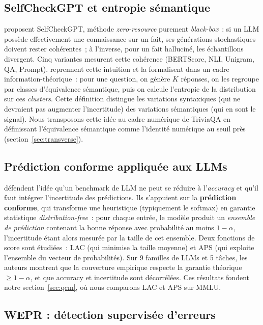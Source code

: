 \documentclass[12pt,a4paper]{article}
\begin{document}
\subsection{SelfCheckGPT et entropie sémantique}

\citet{manakul2023selfcheckgpt} proposent SelfCheckGPT, méthode \textit{zero-resource} purement \textit{black-box}~: si un LLM possède effectivement une connaissance sur un fait, ses générations stochastiques doivent rester cohérentes~; à l'inverse, pour un fait halluciné, les échantillons divergent. Cinq variantes mesurent cette cohérence (BERTScore, NLI, Unigram, QA, Prompt). \citet{kuhn2023semantic} reprennent cette intuition et la formalisent dans un cadre information-théorique~: pour une question, on génère $K$ réponses, on les regroupe par classes d'équivalence sémantique, puis on calcule l'entropie de la distribution sur ces \emph{clusters}. Cette définition distingue les variations syntaxiques (qui ne devraient pas augmenter l'incertitude) des variations sémantiques (qui en sont le signal). Nous transposons cette idée au cadre numérique de TriviaQA en définissant l'équivalence sémantique comme l'identité numérique au seuil près (section~\ref{sec:transverse}).

\subsection{Prédiction conforme appliquée aux LLMs}

\citet{ye2024benchmarking} défendent l'idée qu'un benchmark de LLM ne peut se réduire à l'\textit{accuracy} et qu'il faut intégrer l'incertitude des prédictions. Ils s'appuient sur la \textbf{prédiction conforme}, qui transforme une heuristique (typiquement le softmax) en garantie statistique \textit{distribution-free}~: pour chaque entrée, le modèle produit un \emph{ensemble de prédiction} contenant la bonne réponse avec probabilité au moins $1-\alpha$, l'incertitude étant alors mesurée par la taille de cet ensemble. Deux fonctions de score sont étudiées~: LAC (qui minimise la taille moyenne) et APS (qui exploite l'ensemble du vecteur de probabilités). Sur 9 familles de LLMs et 5 tâches, les auteurs montrent que la couverture empirique respecte la garantie théorique $\geq 1-\alpha$, et que accuracy et incertitude sont décorrélées. Ces résultats fondent notre section~\ref{sec:qcm}, où nous comparons LAC et APS sur MMLU.

\subsection{WEPR : détection supervisée d'erreurs}
\end{document}
